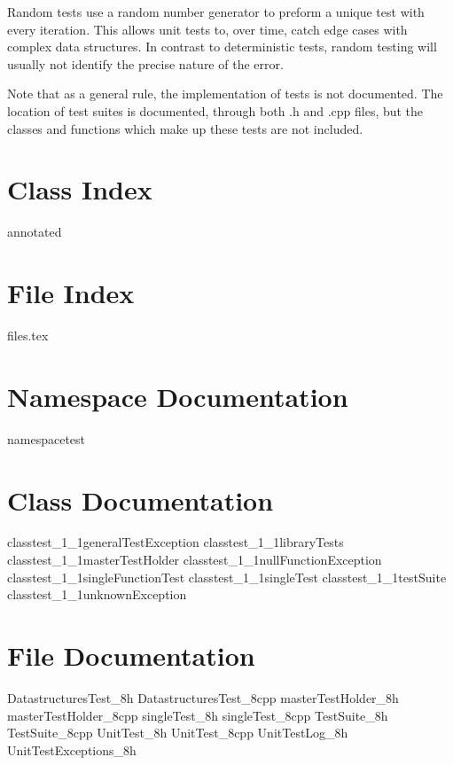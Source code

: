 	Random tests use a random number generator to preform a unique test with every iteration.  This allows unit tests to, over time, catch edge cases with complex data structures.  In contrast to deterministic tests, random testing will usually not identify the precise nature of the error.

	Note that as a general rule, the implementation of tests is not documented.  The location of test suites is documented, through both .h and .cpp files, but the classes and functions which make up these tests are not included.

\renewcommand{\DOXYGENFOLDER}{../../UnitTest/Documentation/doxygenFiles/latex/}
	
	\chapter{Class Index}
		{annotated}
	\chapter{File Index}
		{files.tex}
	\chapter{Namespace Documentation}
		{namespacetest}
	
	\chapter{Class Documentation}
		{classtest_1_1generalTestException}
		{classtest_1_1libraryTests}
		{classtest_1_1masterTestHolder}
		{classtest_1_1nullFunctionException}
		{classtest_1_1singleFunctionTest}
		{classtest_1_1singleTest}
		{classtest_1_1testSuite}
		{classtest_1_1unknownException}
	
	\chapter{File Documentation}
		{DatastructuresTest_8h}
		{DatastructuresTest_8cpp}
		{masterTestHolder_8h}
		{masterTestHolder_8cpp}
		{singleTest_8h}
		{singleTest_8cpp}
		{TestSuite_8h}
		{TestSuite_8cpp}
		{UnitTest_8h}
		{UnitTest_8cpp}
		{UnitTestLog_8h}
		{UnitTestExceptions_8h}
		